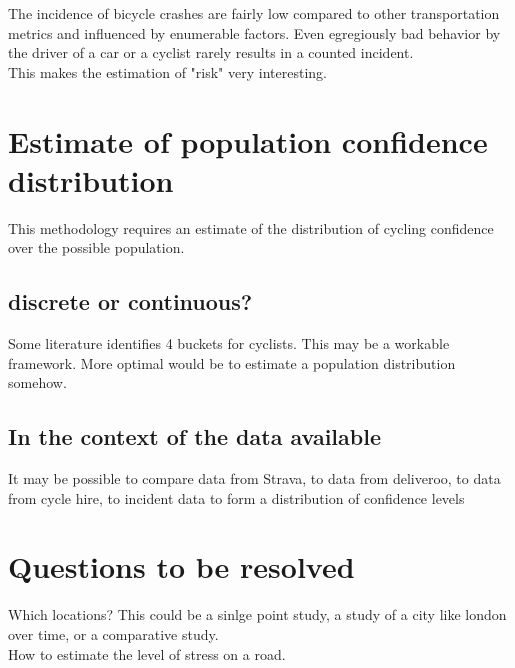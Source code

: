 \documentclass [12pt]{article}
\begin{document}
The incidence of bicycle crashes are fairly low compared to other transportation metrics and influenced by enumerable factors. Even egregiously bad behavior by the driver of a car or a cyclist rarely results in a counted incident. \\

This makes the estimation of "risk" very interesting. 

\section{Estimate of population confidence distribution}

This methodology requires an estimate of the distribution of cycling confidence over the possible population. 

\subsection{discrete or continuous?}

Some literature identifies 4 buckets for cyclists. This may be a workable framework. More optimal would be to estimate a population distribution somehow.

\subsection {In the context of the data available}

It may be possible to compare data from Strava, to data from deliveroo, to data from cycle hire, to incident data to form a distribution of confidence levels 

\section{Questions to be resolved}

Which locations? This could be a sinlge point study, a study of a city like london over time, or a comparative study. \\

How to estimate the level of stress on a road.




\nocite{*}


\end{document}
